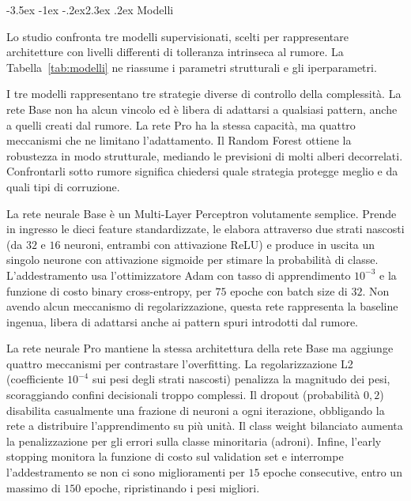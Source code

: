 \documentclass[12pt,a4paper]{article}
\makeatletter
\renewcommand\section{\@startsection{section}{1}{\z@}%
  {-3.5ex \@plus -1ex \@minus -.2ex}{2.3ex \@plus.2ex}%
  {\normalfont\Large\bfseries}}
\makeatother
\begin{document}
\section{Modelli}\label{sec:modelli}

Lo studio confronta tre modelli supervisionati, scelti per rappresentare
architetture con livelli differenti di tolleranza intrinseca al rumore. La
Tabella~\ref{tab:modelli} ne riassume i parametri strutturali e gli
iperparametri.

I tre modelli rappresentano tre strategie diverse di controllo della
complessità. La rete Base non ha alcun vincolo ed è libera di adattarsi a
qualsiasi pattern, anche a quelli creati dal rumore. La rete Pro ha la stessa
capacità, ma quattro meccanismi che ne limitano l'adattamento. Il Random Forest
ottiene la robustezza in modo strutturale, mediando le previsioni di molti
alberi decorrelati. Confrontarli sotto rumore significa chiedersi quale
strategia protegge meglio e da quali tipi di corruzione.

La rete neurale Base è un Multi-Layer Perceptron volutamente semplice. Prende in
ingresso le dieci feature standardizzate, le elabora attraverso due strati
nascosti (da $32$ e $16$ neuroni, entrambi con attivazione ReLU) e produce in
uscita un singolo neurone con attivazione sigmoide per stimare la probabilità di
classe. L'addestramento usa l'ottimizzatore Adam con tasso di apprendimento
$10^{-3}$ e la funzione di costo binary cross-entropy, per $75$ epoche con batch
size di $32$. Non avendo alcun meccanismo di regolarizzazione, questa rete
rappresenta la baseline ingenua, libera di adattarsi anche ai pattern spuri
introdotti dal rumore.

La rete neurale Pro mantiene la stessa architettura della rete Base ma aggiunge
quattro meccanismi per contrastare l'overfitting. La regolarizzazione L2
(coefficiente $10^{-4}$ sui pesi degli strati nascosti) penalizza la magnitudo
dei pesi, scoraggiando confini decisionali troppo complessi. Il dropout
(probabilità $0{,}2$) disabilita casualmente una frazione di neuroni a ogni
iterazione, obbligando la rete a distribuire l'apprendimento su più unità. Il
class weight bilanciato aumenta la penalizzazione per gli errori sulla classe
minoritaria (adroni). Infine, l'early stopping monitora la funzione di costo sul
validation set e interrompe l'addestramento se non ci sono miglioramenti per
$15$ epoche consecutive, entro un massimo di $150$ epoche, ripristinando i pesi
migliori.
\end{document}

